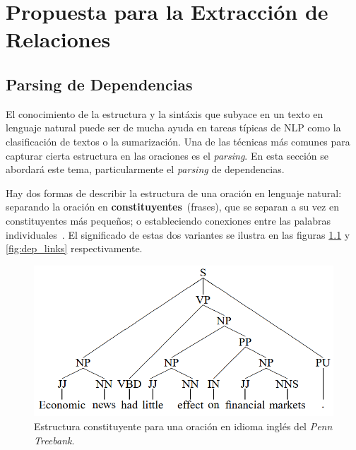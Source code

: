 \chapter{Propuesta para la Extracción de Relaciones}\label{chapter:relations}


\section{Parsing de Dependencias}\label{sec:parsing}

El conocimiento de la estructura y la sint\'axis que subyace en un texto en lenguaje natural puede ser de mucha ayuda en tareas t\'ipicas de NLP como la clasificaci\'on de textos o la sumarizaci\'on. Una de las t\'ecnicas m\'as comunes para capturar cierta estructura en las oraciones es el \emph{parsing}. En esta secci\'on se abordar\'a este tema, particularmente el \emph{parsing} de dependencias.

Hay dos formas de describir la estructura de una oraci\'on en lenguaje natural: separando la oraci\'on en \textbf{constituyentes}~(frases), que se separan a su vez en constituyentes m\'as peque\~nos; o estableciendo conexiones entre las palabras individuales~\cite{covington2001fundamental}. El significado de estas dos variantes se ilustra en las figuras \ref{fig:dep_const} y \ref{fig:dep_links} respectivamente.

\begin{figure}[h!]
	\centering
	\includegraphics[width=0.8\linewidth]{Graphics/dep_const.png}
	\caption{Estructura constituyente para una oraci\'on en idioma ingl\'es del \emph{Penn Treebank}.}\label{fig:dep_const}
\end{figure}

